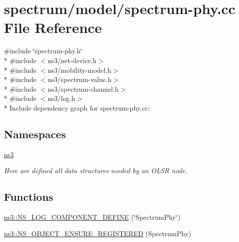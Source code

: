 \hypertarget{spectrum-phy_8cc}{}\section{spectrum/model/spectrum-\/phy.cc File Reference}
\label{spectrum-phy_8cc}
{\ttfamily \#include \char`\"{}spectrum-\/phy.\+h\char`\"{}}\\*
{\ttfamily \#include $<$ns3/net-\/device.\+h$>$}\\*
{\ttfamily \#include $<$ns3/mobility-\/model.\+h$>$}\\*
{\ttfamily \#include $<$ns3/spectrum-\/value.\+h$>$}\\*
{\ttfamily \#include $<$ns3/spectrum-\/channel.\+h$>$}\\*
{\ttfamily \#include $<$ns3/log.\+h$>$}\\*
Include dependency graph for spectrum-\/phy.cc\+:
\subsection*{Namespaces}
\begin{DoxyCompactItemize}
\item 
 \hyperlink{namespacens3}{ns3}
\begin{DoxyCompactList}\small\item\em Here are defined all data structures needed by an O\+L\+SR node. \end{DoxyCompactList}\end{DoxyCompactItemize}
\subsection*{Functions}
\begin{DoxyCompactItemize}
\item 
\hyperlink{namespacens3_a3c84446573e245a7a21082e5562a5a75}{ns3\+::\+N\+S\+\_\+\+L\+O\+G\+\_\+\+C\+O\+M\+P\+O\+N\+E\+N\+T\+\_\+\+D\+E\+F\+I\+NE} (\char`\"{}Spectrum\+Phy\char`\"{})
\item 
\hyperlink{namespacens3_a7954b885ab15f082757e428f1c577151}{ns3\+::\+N\+S\+\_\+\+O\+B\+J\+E\+C\+T\+\_\+\+E\+N\+S\+U\+R\+E\+\_\+\+R\+E\+G\+I\+S\+T\+E\+R\+ED} (Spectrum\+Phy)
\end{DoxyCompactItemize}
